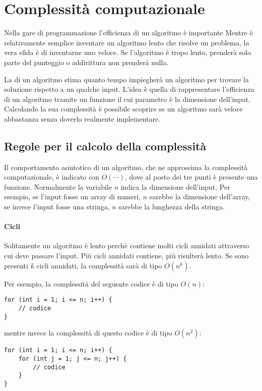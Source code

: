 \chapter{Complessità computazionale}


Nella gare di programmazione l'efficienza di un algoritmo è importante
Mentre è relativamente semplice inventare un algoritmo lento che risolve un problema,
la vera sfida è di inventarne uno veloce.
Se l'algoritmo è tropo lento, prenderà solo parte del punteggio
o addirittura non prenderà nulla.

La  di un algoritmo
stima quanto tempo impiegherà un algoritmo per trovare la 
soluzione rispetto a un qualche input.
L'idea è quella di rappresentare l'efficienza di un algoritmo
tramite un funzione il cui parametro è la dimensione dell'input.
Calcolando la sua complessità è possibile 
scoprire se un algoritmo sarà veloce abbastanza 
senza doverlo realmente implementare.

\section{Regole per il calcolo della complessità}

Il comportamento asintotico di un algoritmo,
che ne approssima la complessità computazionale,
è indicato con $O(\cdots)$,
dove al posto dei tre punti è presente una funzione.
Normalmente la variabile $n$ indica la dimensione dell'input.
Per esempio, se l'input fosse un array di numeri,
$n$ sarebbe la dimensione dell'array, se invece l'input
fosse una stringa, $n$ sarebbe la lunghezza della stringa. 

\subsubsection*{Cicli}

Solitamente un algoritmo è lento perchè 
contiene molti cicli annidati attraverso cui deve passare l'input.
Più cicli annidati contiene, più risulterà lento.
Se sono presenti $k$ cicli annidati,
la complessità sarà di tipo $O(n^k)$.

Per esempio, la complessità del seguente codice è di tipo $O(n)$:
\begin{lstlisting}
for (int i = 1; i <= n; i++) {
    // codice
}
\end{lstlisting}

mentre invece la complessità di questo codice è di tipo $O(n^2)$:
\begin{lstlisting}
for (int i = 1; i <= n; i++) {
    for (int j = 1; j <= n; j++) {
        // codice
    }
}
\end{lstlisting}

